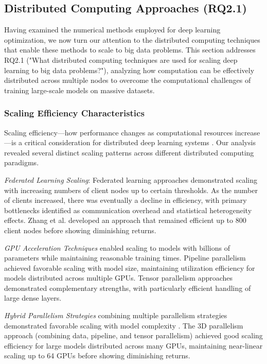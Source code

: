 \subsection{Distributed Computing Approaches (RQ2.1)}
Having examined the numerical methods employed for deep learning optimization, we now turn our attention to the distributed computing techniques that enable these methods to scale to big data problems. This section addresses RQ2.1 ("What distributed computing techniques are used for scaling deep learning to big data problems?"), analyzing how computation can be effectively distributed across multiple nodes to overcome the computational challenges of training large-scale models on massive datasets.

\subsubsection{Scaling Efficiency Characteristics}
Scaling efficiency—how performance changes as computational resources increase—is a critical consideration for distributed deep learning systems \citep{Zhang20229876}. Our analysis revealed several distinct scaling patterns across different distributed computing paradigms.

\textit{Federated Learning Scaling}: Federated learning approaches demonstrated scaling with increasing numbers of client nodes up to certain thresholds. As the number of clients increased, there was eventually a decline in efficiency, with primary bottlenecks identified as communication overhead and statistical heterogeneity effects. Zhang et al. \citep{Zhang20229876} developed an approach that remained efficient up to 800 client nodes before showing diminishing returns.

\textit{GPU Acceleration Techniques} enabled scaling to models with billions of parameters while maintaining reasonable training times. Pipeline parallelism achieved favorable scaling with model size, maintaining utilization efficiency for models distributed across multiple GPUs. Tensor parallelism approaches demonstrated complementary strengths, with particularly efficient handling of large dense layers.

\textit{Hybrid Parallelism Strategies} combining multiple parallelism strategies demonstrated favorable scaling with model complexity \citep{Narayanan2021}. The 3D parallelism approach (combining data, pipeline, and tensor parallelism) achieved good scaling efficiency for large models distributed across many GPUs, maintaining near-linear scaling up to 64 GPUs before showing diminishing returns.

